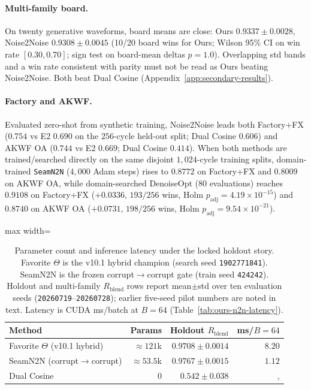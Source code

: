 \paragraph{Multi-family board.}
On twenty generative waveforms, board means are close:
Ours $0.9337{\pm}0.0028$, Noise2Noise $0.9308{\pm}0.0045$
(10/20 board wins for Ours; Wilson 95\% CI on win rate $[0.30,0.70]$; sign test on board-mean deltas $p{=}1.0$).
Overlapping std bands and a win rate consistent with parity must not be read as Ours beating Noise2Noise.
Both beat Dual Cosine (Appendix~\ref{app:secondary-results}).

\paragraph{Factory and AKWF.}
Evaluated zero-shot from synthetic training, Noise2Noise leads both Factory+FX ($0.754$ vs E2 $0.690$ on the $256$-cycle held-out split; Dual Cosine $0.606$) and AKWF OA ($0.744$ vs E2 $0.669$; Dual Cosine $0.414$).
When both methods are trained/searched directly on the same disjoint $1{,}024$-cycle training splits, domain-trained \texttt{SeamN2N} ($4{,}000$ Adam steps) rises to $0.8772$ on Factory+FX and $0.8009$ on AKWF OA, while domain-searched DenoiseOpt ($80$ evaluations) reaches $\mathbf{0.9108}$ on Factory+FX ($+0.0336$, $193/256$ wins, Holm $p_{\mathrm{adj}}{=}4.19{\times}10^{-15}$) and $\mathbf{0.8740}$ on AKWF OA ($+0.0731$, $198/256$ wins, Holm $p_{\mathrm{adj}}{=}9.54{\times}10^{-21}$).

\begin{table}[htbp]
  \centering
  \caption{Parameter count and inference latency under the locked holdout story.
    Favorite $\Theta$ is the v10.1 hybrid champion (search seed \texttt{1902771841}).
    SeamN2N is the frozen corrupt$\to$corrupt gate (train seed \texttt{424242}).
    Holdout and multi-family $R_{\mathrm{blend}}$ rows report mean$\pm$std over ten evaluation seeds (\texttt{20260719}--\texttt{20260728}); earlier five-seed pilot numbers are noted in text.
    Latency is CUDA ms/batch at $B{=}64$ (Table~\ref{tab:ours-n2n-latency}).}
  \label{tab:param-fairness}
  \setlength{\tabcolsep}{4pt}
  \begin{adjustbox}{max width=\columnwidth}
\begin{tabular}{@{}lrrr@{}}
    \toprule
    Method & Params & Holdout $R_{\mathrm{blend}}$ & ms/$B{=}64$ \\
    \midrule
    Favorite $\Theta$ (v10.1 hybrid) & ${\approx}121$k & $0.9708{\pm}0.0014$ & $8.20$ \\
    SeamN2N (corrupt$\to$corrupt) & ${\approx}53.5$k & $0.9767{\pm}0.0015$ & $1.12$ \\
    Dual Cosine & $0$ & $0.542{\pm}0.038$ &, \\
    \bottomrule
  \end{tabular}
\end{adjustbox}
\end{table}


